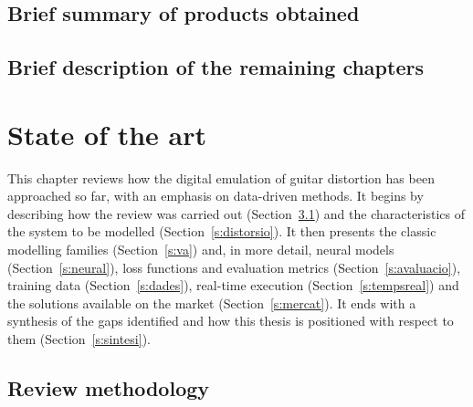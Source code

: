 \documentclass[ENG]{TFUOC}%
\begin{document}
\section{Brief summary of products obtained}

\section{Brief description of the remaining chapters}

\chapter{State of the art}
\label{c:estat}

This chapter reviews how the digital emulation of guitar distortion has been approached so far, with an emphasis on data-driven methods. It begins by describing how the review was carried out (Section~\ref{s:revisio}) and the characteristics of the system to be modelled (Section~\ref{s:distorsio}). It then presents the classic modelling families (Section~\ref{s:va}) and, in more detail, neural models (Section~\ref{s:neural}), loss functions and evaluation metrics (Section~\ref{s:avaluacio}), training data (Section~\ref{s:dades}), real-time execution (Section~\ref{s:tempsreal}) and the solutions available on the market (Section~\ref{s:mercat}). It ends with a synthesis of the gaps identified and how this thesis is positioned with respect to them (Section~\ref{s:sintesi}).

\section{Review methodology}
\label{s:revisio}
\end{document}
